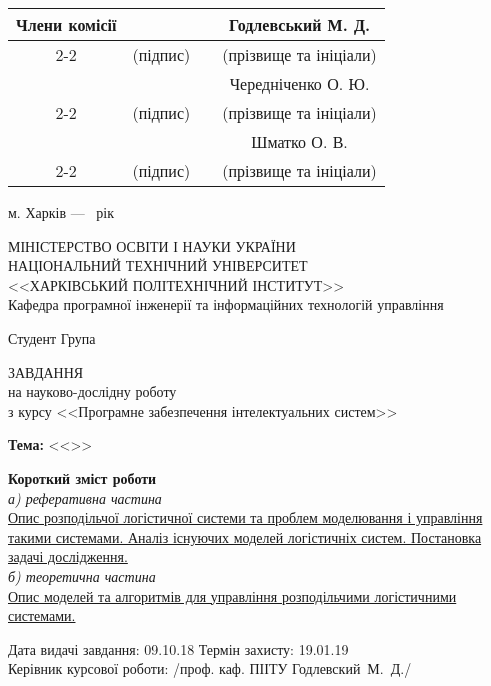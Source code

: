 {\begin{titlepage}
	\begin{flushright}
		\small
		\newcommand{\member}[1]{
			& \hspace{4cm} & & #1 \\ \cline{2-2} \cline{4-4} 
			& {\footnotesize (підпис)} & & {\footnotesize (прізвище та ініціали)}  \\
		}
		\begin{tabular}{cccc}
			Члени комісії 
			\member{Годлевський М. Д.}
			\member{Чередніченко О. Ю.}
			\member{Шматко О. В.}
		\end{tabular}
	\end{flushright}
	
	\vspace*{\fill}

	\begin{center}
		м. Харків --- \the\year~рік
	\end{center}
\end{titlepage}

\begin{titlepage}
	\begin{center}
		МІНІСТЕРСТВО ОСВІТИ І НАУКИ УКРАЇНИ \\
		НАЦІОНАЛЬНИЙ ТЕХНІЧНИЙ УНІВЕРСИТЕТ \\
		<<ХАРКІВСЬКИЙ ПОЛІТЕХНІЧНИЙ ІНСТИТУТ>> \\
		Кафедра програмної інженерії та інформаційних технологій управління
	\end{center}
	\noindent
	Студент \suline{\theauthor} \hfill Група 

	\vspace*{\fill}

	\begin{center}
		\MakeUppercase{Завдання} \\
		на науково-дослідну роботу \\
		з курсу <<Програмне забезпечення інтелектуальних систем>>
	\end{center}
	\noindent
	\textbf{Тема:} <<\thetitle>>
	
	\vspace*{\fill}

	\begin{addmargin}[0cm]{1.5cm} 
		\textbf{Короткий зміст роботи} \\
		\textit{а) реферативна частина} \\
		\uline{
		Опис розподільчої логістичної системи та проблем моделювання і управління такими системами. 
		Аналіз існуючих моделей логістичніх систем.
		Постановка задачі дослідження.
		} \\
		\textit{б) теоретична частина} \\
		\uline{
		Опис моделей та алгоритмів для управління розподільчими логістичними системами.
		}
	\end{addmargin}
	
	\vspace*{\fill}

	\noindent
	Дата видачі завдання: 09.10.18 \hfill Термін захисту: 19.01.19 \\
	Керівник курсової роботи: \hfill /проф. каф. ПІІТУ Годлевский~М.~Д./
\end{titlepage}
}

